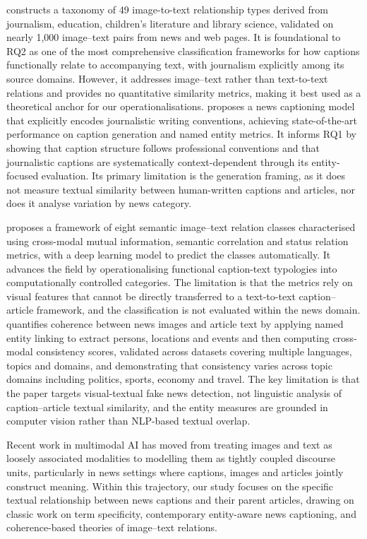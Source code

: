 \documentclass[11pt,a4paper]{article}
\begin{document}
\cite{marsh2003taxonomy} constructs a taxonomy of 49 image-to-text
relationship types derived from journalism, education, children's literature
and library science, validated on nearly 1{,}000 image--text pairs from news
and web pages. It is foundational to RQ2 as one of the most comprehensive
classification frameworks for how captions functionally relate to accompanying
text, with journalism explicitly among its source domains. However, it
addresses image--text rather than text-to-text relations and provides no
quantitative similarity metrics, making it best used as a theoretical anchor
for our operationalisations. \cite{yang2021journalistic} proposes a news
captioning model that explicitly encodes journalistic writing conventions,
achieving state-of-the-art performance on caption generation and named entity
metrics. It informs RQ1 by showing that caption structure follows professional
conventions and that journalistic captions are systematically context-dependent
through its entity-focused evaluation. Its primary limitation is the
generation framing, as it does not measure textual similarity between
human-written captions and articles, nor does it analyse variation by news
category.

\cite{vempati2019understanding} proposes a framework of eight semantic
image--text relation classes characterised using cross-modal mutual
information, semantic correlation and status relation metrics, with a deep
learning model to predict the classes automatically. It advances the field by
operationalising functional caption-text typologies into computationally
controlled categories. The limitation is that the metrics rely on visual
features that cannot be directly transferred to a text-to-text
caption--article framework, and the classification is not evaluated within
the news domain. \cite{mullerbanek2021multimodal} quantifies coherence between
news images and article text by applying named entity linking to extract
persons, locations and events and then computing cross-modal consistency
scores, validated across datasets covering multiple languages, topics and
domains, and demonstrating that consistency varies across topic domains
including politics, sports, economy and travel. The key limitation is that the
paper targets visual-textual fake news detection, not linguistic analysis of
caption--article textual similarity, and the entity measures are grounded in
computer vision rather than NLP-based textual overlap.

Recent work in multimodal AI has moved from treating images and text as
loosely associated modalities to modelling them as tightly coupled discourse
units, particularly in news settings where captions, images and articles
jointly construct meaning. Within this trajectory, our study focuses on the
specific textual relationship between news captions and their parent articles,
drawing on classic work on term specificity, contemporary entity-aware news
captioning, and coherence-based theories of image--text relations.
\end{document}
